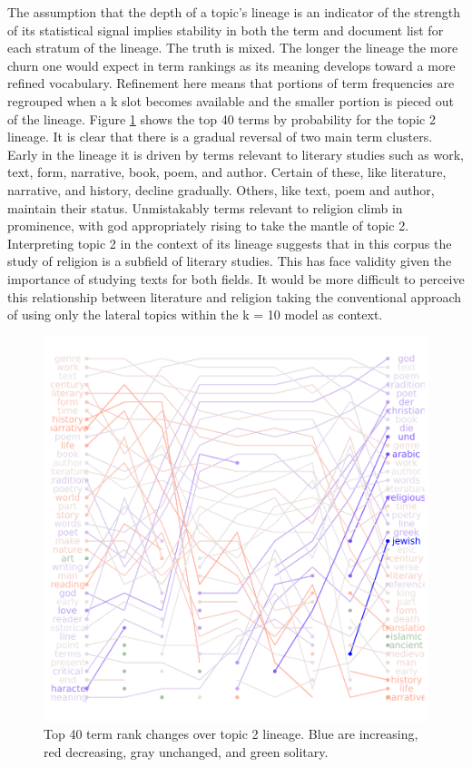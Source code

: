 \documentclass[]{book}
\theoremstyle{definition}
\theoremstyle{definition}
\theoremstyle{definition}
\theoremstyle{remark}
\begin{document}
The assumption that the depth of a topic's lineage is an indicator of
the strength of its statistical signal implies stability in both the
term and document list for each stratum of the lineage. The truth is
mixed. The longer the lineage the more churn one would expect in term
rankings as its meaning develops toward a more refined vocabulary.
Refinement here means that portions of term frequencies are regrouped
when a k slot becomes available and the smaller portion is pieced out of
the lineage. Figure \ref{fig:lineage} shows the top 40 terms by
probability for the topic 2 lineage. It is clear that there is a gradual
reversal of two main term clusters. Early in the lineage it is driven by
terms relevant to literary studies such as work, text, form, narrative,
book, poem, and author. Certain of these, like literature, narrative,
and history, decline gradually. Others, like text, poem and author,
maintain their status. Unmistakably terms relevant to religion climb in
prominence, with god appropriately rising to take the mantle of topic 2.
Interpreting topic 2 in the context of its lineage suggests that in this
corpus the study of religion is a subfield of literary studies. This has
face validity given the importance of studying texts for both fields. It
would be more difficult to perceive this relationship between literature
and religion taking the conventional approach of using only the lateral
topics within the k = 10 model as context.

\begin{figure}

{\centering \includegraphics[width=0.9\linewidth]{03_files/figure-latex/lineage-1} 

}

\caption{Top 40 term rank changes over topic 2 lineage. Blue are increasing, red decreasing, gray unchanged, and green solitary.}\label{fig:lineage}
\end{figure}
\end{document}
